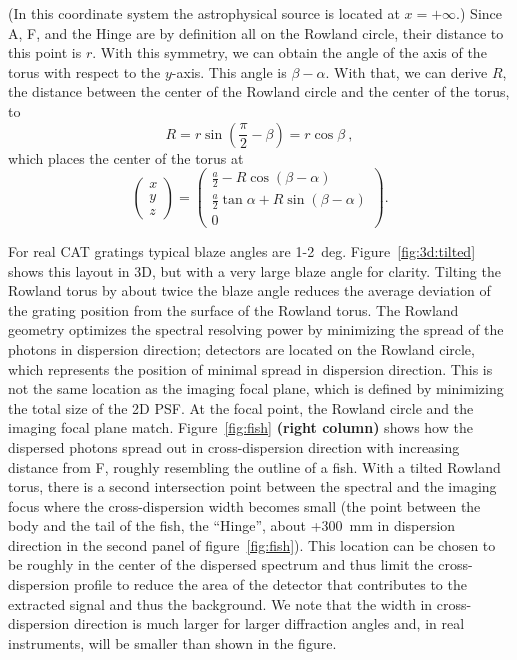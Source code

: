 \documentclass[linenumbers]{aastex631}
\begin{document}
(In this coordinate system the astrophysical source is located at $x=+\infty$.)
Since A, F, and the Hinge are by definition all on the Rowland circle, their distance to this point is $r$. With this symmetry, we can obtain the angle of the axis of the torus with respect to the $y$-axis. This angle is $\beta-\alpha$. With that, we can derive $R$, the distance between the center of the Rowland circle and the center of the torus, to
\begin{equation}
    R = r \sin\left(\frac{\pi}{2} - \beta\right) = r \cos\beta\ ,
\end{equation}
which places the center of the torus at
\begin{equation}
    \begin{pmatrix} x \\ y \\ z \end{pmatrix} =
    \begin{pmatrix}
        \frac{a}{2}-R\cos{(\beta-\alpha)} \\
        \frac{a}{2}\tan{\alpha}+R\sin{(\beta-\alpha)}
        \\ 0
        \end{pmatrix}.
\end{equation}

For real CAT gratings typical blaze angles are 1-2~deg. Figure~\ref{fig:3d:tilted} shows this layout in 3D, but with a very large blaze angle for clarity. Tilting the Rowland torus by about twice the blaze angle reduces the average deviation of the grating position from the surface of the Rowland torus.
The Rowland geometry optimizes the spectral resolving power by minimizing the spread of the photons in dispersion direction; detectors are located on the Rowland circle, which represents the position of minimal spread in dispersion direction. This is not the same location as the imaging focal plane, which is defined by minimizing the total size of the 2D PSF. At the focal point, the Rowland circle and the imaging focal plane match. Figure~\ref{fig:fish} \textbf{(right column)} shows how the dispersed photons spread out in cross-dispersion direction with increasing distance from F, roughly resembling the outline of a fish. With a tilted Rowland torus, there is a second intersection point between the spectral and the imaging focus where the cross-dispersion width becomes small (the point between the body and the tail of the fish, the ``Hinge'', about +300~mm in dispersion direction in the second panel of figure~\ref{fig:fish}). This location can be chosen to be roughly in the center of the dispersed spectrum and thus limit the cross-dispersion profile to reduce the area of the detector that contributes to the extracted signal and thus the background. We note that the width in cross-dispersion direction is much larger for larger diffraction angles and, in real instruments, will be smaller than shown in the figure.
\end{document}
